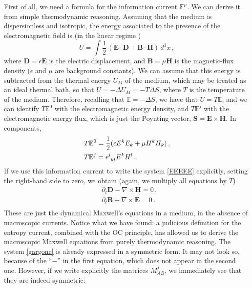 \documentclass[a4paper, amsfonts, amssymb, amsmath, reprint, showkeys, nofootinbib, twoside, onecolumn,notitlepage]{revtex4-1}
\begin{document}
First of all, we need a formula for the information current $\mathbb{E}^\mu$. We can derive it from simple thermodynamic reasoning. Assuming that the medium is dispersionless and isotropic, the energy associated to the presence of the electromagnetic field is (in the linear regime \cite{jackson_classical_1999})
\begin{equation}
U = \int \dfrac{1}{2} \, (\textbf{E}\cdot \textbf{D} + \textbf{B} \cdot \textbf{H}) \, d^3 x \, ,
\end{equation}
where $\textbf{D}=\epsilon \textbf{E}$ is the electric displacement, and $\textbf{B}=\mu \textbf{H}$ is the magnetic-flux density ($\epsilon$ and $\mu$ are background constants). We can assume that this energy is subtracted from the thermal energy $U_M$ of the medium, which may be treated as an ideal thermal bath, so that $U=-\Delta U_M = -T \Delta S$, where $T$ is the temperature of the medium. Therefore, recalling that $\mathbb{E}=-\Delta S$, we have that $U=T\mathbb{E}$, and we can identify $T\mathbb{E}^0$ with the electromagnetic energy density, and $T\mathbb{E}^j$ with the electromagnetic energy flux, which is just the Poynting vector, $\textbf{S}=\textbf{E}\times \textbf{H}$. In components,
\begin{equation}
\begin{split}
& T\mathbb{E}^0= \dfrac{1}{2} (\epsilon E^k E_k + \mu H^k H_k) \, , \\
& T\mathbb{E}^j= \epsilon\indices{^j _k _l} E^k H^l \, . \\
\end{split}
\end{equation}
If we use this information current to write the system \eqref{EEEEE} explicitly, setting the right-hand side to zero, we obtain (again, we multiply all equations by $T$)
\begin{equation}\label{gargone}
\begin{split}
& \partial_t \textbf{D}-\nabla \times \textbf{H}=0 \, ,\\
& \partial_t \textbf{B} + \nabla \times \textbf{E}=0 \, . \\
\end{split}
\end{equation}
These are just the dynamical Maxwell's equations in a medium, in the absence of macroscopic currents. Notice what we have found: a judicious definition for the entropy current, combined with the OC principle, has allowed us to derive the macroscopic Maxwell equations from purely thermodynamic reasoning. The system \eqref{gargone} is already expressed in a symmetric form. It may not look so, because of the ``$-$'' in the first equation, which does not appear in the second one. However, if we write explicitly the matrices $M^j_{AB}$, we immediately see that they are indeed symmetric:
\end{document}
